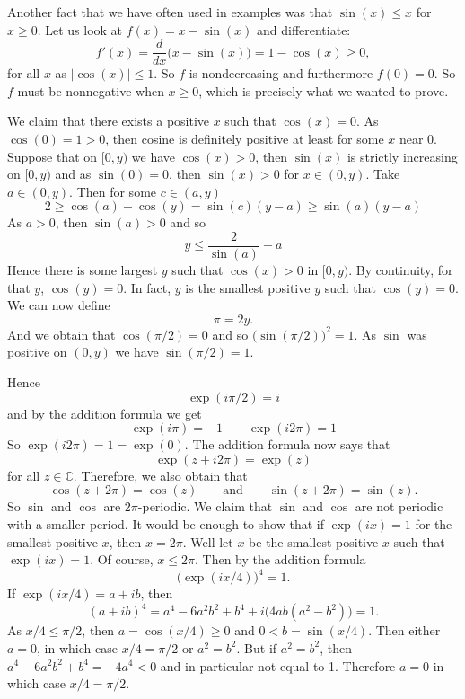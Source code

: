 \documentclass[12pt]{book}
\newcommand{\abs}[1]{\left\lvert {#1} \right\rvert}
\newcommand{\C}{{\mathbb{C}}}
\theoremstyle{plain}
\theoremstyle{remark}
\theoremstyle{definition}
\theoremstyle{exercise}
\theoremstyle{example}
\begin{document}
Another fact that we have often used in examples was that $\sin(x) \leq x$
for $x \geq 0$.  Let us look at
$f(x) = x-\sin(x)$ and differentiate:
$$
f'(x) = \frac{d}{dx} \bigl( x - \sin(x) \bigr)
=
1 -\cos(x) \geq 0 ,
$$
for all $x$ as $\abs{\cos(x)} \leq 1$.
So $f$ is nondecreasing and
furthermore $f(0) = 0$.  So $f$ must be nonnegative when $x \geq 0$, which is
precisely what we wanted to prove.

\medskip

We claim that there exists a positive $x$ such that $\cos(x) = 0$.
As $\cos(0) = 1 > 0$, then cosine is definitely positive at least
for some $x$ near 0.
Suppose that on $[0,y)$ we have $\cos(x) > 0$, then $\sin(x)$ is strictly
increasing on $[0,y)$ and as $\sin(0) = 0$, then
$\sin(x) > 0$ for $x \in (0,y)$.  Take $a \in (0,y)$.  Then
for some $c \in (a,y)$
$$
2 \geq \cos(a)-\cos(y) = \sin(c)(y-a) \geq \sin(a)(y-a)
$$
As $a > 0$, then $\sin(a) > 0$ and so
$$
y \leq \frac{2}{\sin(a)} + a
$$
Hence there is some largest $y$ such that $\cos(x) > 0$ in $[0,y)$.  By
continuity, for that $y$,
$\cos(y) = 0$.  In fact, $y$ is the
smallest positive $y$ such that $\cos(y) = 0$.  We can now define
$$
\pi = 2y .
$$
And we obtain that $\cos(\pi/2) = 0$ and so $\bigl(\sin(\pi/2)\bigr)^2 = 1$.
As $\sin$ was positive on $(0,y)$ we have
$\sin(\pi/2) = 1$.

Hence
$$
\exp(i \pi /2) = i
$$
and by the addition formula we get
$$
\exp(i \pi) = -1
\qquad 
\exp(i 2\pi) = 1
$$
So $\exp(i2\pi) = 1 = \exp(0)$.  The addition formula now says
that
$$
\exp(z+i2\pi) = \exp(z)
$$
for all $z \in \C$.  Therefore, we also obtain that
$$
\cos(z+2\pi) = \cos(z)
\qquad\text{and}\qquad
\sin(z+2\pi) = \sin(z) .
$$
So $\sin$ and $\cos$ are $2\pi$-periodic.
We claim that $\sin$ and $\cos$ are not periodic with a smaller period.  It
would be enough to show that if $\exp(ix) = 1$ for the
smallest positive $x$, then
$x = 2\pi$.
Well let $x$ be the smallest positive $x$ such that
$\exp(ix) = 1$.
Of course, $x \leq 2\pi$.
Then by the addition formula
\begin{equation*}
{\bigl(\exp(ix/4)\bigr)}^4 = 1  .
\end{equation*}
If $\exp(ix/4) = a+ib$, then
\begin{equation*}
{(a+ib)}^4
=a^4-6a^2b^2+b^4 + i\bigl(4ab(a^2-b^2)\bigr)
=1 .
\end{equation*}
As $x/4 \leq \pi/2$, then $a = \cos(x/4) \geq 0$ and
$0 < b = \sin(x/4)$.  Then either $a = 0$, in which case
$x/4 = \pi/2$ or $a^2 = b^2$.  But if $a^2=b^2$, then
$a^4-6a^2b^2+b^4 = -4a^4 < 0$ and in particular not equal to 1.
Therefore $a=0$ in which case $x/4 = \pi/2$.
\end{document}
